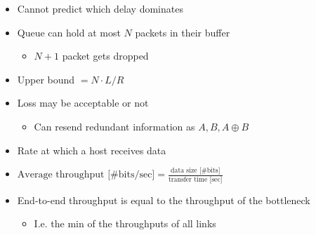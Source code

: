 \begin{itemize}
\begin{itemize}
\begin{itemize}
                \end{itemize}
            \item Cannot predict which delay dominates
        \end{itemize}
        \begin{itemize}
            \item Queue can hold at most $N$ packets in their buffer
                \begin{itemize}
                    \item $N + 1$ packet gets dropped
                \end{itemize}
            \item Upper bound $= N \cdot L / R$
            \item Loss may be acceptable or not
                \begin{itemize}
                    \item Can resend redundant information as $A, B, A \oplus B$
                \end{itemize}
        \end{itemize}
        \begin{itemize}
            \item Rate at which a host receives data
            \item $\text{Average throughput [\# bits/sec]} = \frac{\text{data size [\# bits]}}{\text{transfer time [sec]}}$
            \item End-to-end throughput is equal to the throughput of the bottleneck
                \begin{itemize}
                    \item I.e. the min of the throughputs of all links
                \end{itemize}
        \end{itemize}
\end{itemize}
